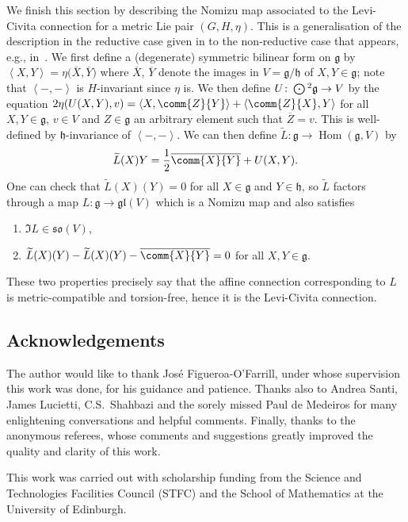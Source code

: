 \documentclass[10pt,a4paper]{amsart}
\numberwithin{equation}{section}
\newcommand{\fg}{\mathfrak{g}}
\newcommand{\fh}{\mathfrak{h}}
\newcommand{\fgl}{\mathfrak{gl}}
\newcommand{\fso}{\mathfrak{so}}
\newcommand{\Odot}{\mathchoice{{\textstyle\bigodot}}{\bigodot}{\bigodot}{\bigodot}}
\newcommand{\1}{\mathbbm{1}}
\newcommand{\pair}[2]{\left\langle #1,#2\right\rangle} %
\DeclareMathOperator{\Hom}{Hom}
\begin{document}
We finish this section by describing the Nomizu map associated to the Levi-Civita connection for a metric Lie pair $(G,H,\eta)$. This is a generalisation of the description in the reductive case given in \cite{Nomizu1969} to the non-reductive case that appears, e.g., in~\cite{Figueroa-OFarrill2017_1}. We first define a (degenerate) symmetric bilinear form on $\fg$ by $\pair{X}{Y}=\eta\bigl(\overline{X},\overline{Y}\bigr)$ where $\overline{X}$, $\overline{Y}$ denote the images in $V=\fg/\fh$ of $X,Y\in\fg$; note that $\pair{-}{-}$ is $H$-invariant since $\eta$ is. We then define $U\colon \Odot^2\fg\to V$ by the equation
$2\eta(U(X,Y),v) = \pair{X}{\comm{Z}{Y}} + \pair{\comm{Z}{X}}{Y}
$
for all $X,Y\in\fg$, $v\in V$ and $Z\in\fg$ an arbitrary element such that $\overline{Z}=v$. This is well-defined by $\fh$-invariance of $\pair{-}{-}$. We can then define $\widetilde{L}\colon \fg\to\Hom(\fg,V)$ by
\[
	\widetilde{L}(X)Y = \frac{1}{2}\overline{\comm{X}{Y}} + U(X,Y).
\]
One can check that $\widetilde{L}(X)(Y)=0$ for all $X\in\fg$ and $Y\in\fh$, so $\widetilde{L}$ factors through a map $L\colon \fg\to\fgl(V)$ which is a Nomizu map and also satisfies
\begin{enumerate}\itemsep=0pt
	\item $\Im L\in\fso(V)$,
	\item $\widetilde{L}(X)(Y) - \widetilde{L}(X)(Y) - \overline{\comm{X}{Y}} = 0$ for all $X,Y\in \fg$.
\end{enumerate}
These two properties precisely say that the affine connection corresponding to $L$ is metric-compatible and torsion-free, hence it is the Levi-Civita connection.

\subsection*{Acknowledgements}

The author would like to thank Jos\'e Figueroa-O'Farrill, under whose supervision this work was done, for his guidance and patience. Thanks also to Andrea Santi, James Lucietti, C.S.~Shahbazi and the sorely missed Paul de Medeiros for many enlightening conversations and helpful comments. Finally, thanks to the anonymous referees, whose comments and suggestions greatly improved the quality and clarity of this work.

This work was carried out with scholarship funding from the Science and Technologies Facilities Council (STFC) and the School of Mathematics at the University of Edinburgh.
\end{document}
